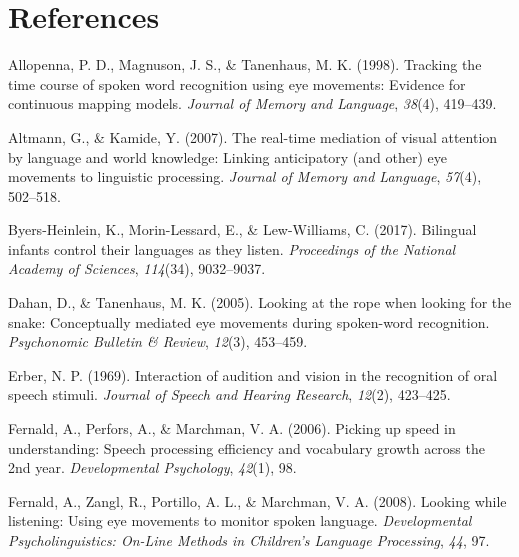\documentclass[english,floatsintext,man]{apa6}
\theoremstyle{definition}
\theoremstyle{definition}
\theoremstyle{definition}
\theoremstyle{remark}
\begin{document}
\newpage

\hypertarget{references}{%
\section{References}\label{references}}

\setlength{\parindent}{-0.5in}
\setlength{\leftskip}{0.5in}

\hypertarget{refs}{}
\leavevmode\hypertarget{ref-allopenna1998tracking}{}%
Allopenna, P. D., Magnuson, J. S., \& Tanenhaus, M. K. (1998). Tracking
the time course of spoken word recognition using eye movements: Evidence
for continuous mapping models. \emph{Journal of Memory and Language},
\emph{38}(4), 419--439.

\leavevmode\hypertarget{ref-altmann2007real}{}%
Altmann, G., \& Kamide, Y. (2007). The real-time mediation of visual
attention by language and world knowledge: Linking anticipatory (and
other) eye movements to linguistic processing. \emph{Journal of Memory
and Language}, \emph{57}(4), 502--518.

\leavevmode\hypertarget{ref-byers2017bilingual}{}%
Byers-Heinlein, K., Morin-Lessard, E., \& Lew-Williams, C. (2017).
Bilingual infants control their languages as they listen.
\emph{Proceedings of the National Academy of Sciences}, \emph{114}(34),
9032--9037.

\leavevmode\hypertarget{ref-dahan2005looking}{}%
Dahan, D., \& Tanenhaus, M. K. (2005). Looking at the rope when looking
for the snake: Conceptually mediated eye movements during spoken-word
recognition. \emph{Psychonomic Bulletin \& Review}, \emph{12}(3),
453--459.

\leavevmode\hypertarget{ref-erber1969interaction}{}%
Erber, N. P. (1969). Interaction of audition and vision in the
recognition of oral speech stimuli. \emph{Journal of Speech and Hearing
Research}, \emph{12}(2), 423--425.

\leavevmode\hypertarget{ref-fernald2006picking}{}%
Fernald, A., Perfors, A., \& Marchman, V. A. (2006). Picking up speed in
understanding: Speech processing efficiency and vocabulary growth across
the 2nd year. \emph{Developmental Psychology}, \emph{42}(1), 98.

\leavevmode\hypertarget{ref-fernald2008looking}{}%
Fernald, A., Zangl, R., Portillo, A. L., \& Marchman, V. A. (2008).
Looking while listening: Using eye movements to monitor spoken language.
\emph{Developmental Psycholinguistics: On-Line Methods in Children's
Language Processing}, \emph{44}, 97.
\end{document}
